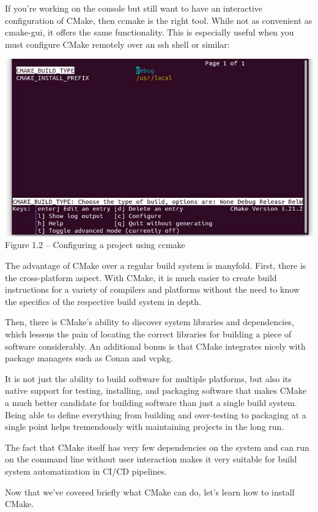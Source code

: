 If you're working on the console but still want to have an interactive configuration of CMake, then ccmake is the right tool. While not as convenient as cmake-gui, it offers the same functionality. This is especially useful when you must configure CMake remotely over an ssh shell or similar:

\begin{center}
\includegraphics[width=1.\textwidth]{content/1/chapter1/images/2.jpg}\\
Figure 1.2 – Configuring a project using ccmake
\end{center}

The advantage of CMake over a regular build system is manyfold. First, there is the cross-platform aspect. With CMake, it is much easier to create build instructions for a variety of compilers and platforms without the need to know the specifics of the respective build system in depth.

Then, there is CMake's ability to discover system libraries and dependencies, which lessens the pain of locating the correct libraries for building a piece of software considerably. An additional bonus is that CMake integrates nicely with package managers such as Conan and vcpkg.

It is not just the ability to build software for multiple platforms, but also its native support for testing, installing, and packaging software that makes CMake a much better candidate for building software than just a single build system. Being able to define everything from building and over-testing to packaging at a single point helps tremendously with maintaining projects in the long run.

The fact that CMake itself has very few dependencies on the system and can run on the command line without user interaction makes it very suitable for build system automatization in CI/CD pipelines.

Now that we've covered briefly what CMake can do, let's learn how to install CMake.






















